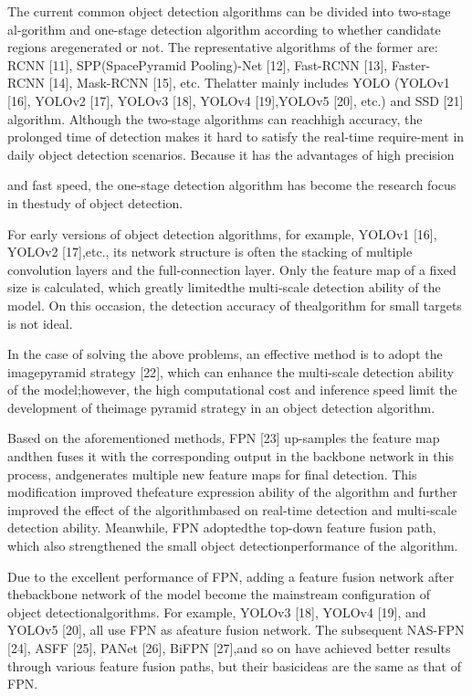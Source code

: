 \documentclass[
  10
]{article}
\begin{document}
The current common object detection algorithms can be divided into
two-stage al-gorithm and one-stage detection algorithm according to
whether candidate regions aregenerated or not. The representative
algorithms of the former are: RCNN {[}11{]}, SPP(SpacePyramid
Pooling)-Net {[}12{]}, Fast-RCNN {[}13{]}, Faster-RCNN {[}14{]},
Mask-RCNN {[}15{]}, etc. Thelatter mainly includes YOLO (YOLOv1
{[}16{]}, YOLOv2 {[}17{]}, YOLOv3 {[}18{]}, YOLOv4 {[}19{]},YOLOv5
{[}20{]}, etc.) and SSD {[}21{]} algorithm. Although the two-stage
algorithms can reachhigh accuracy, the prolonged time of detection makes
it hard to satisfy the real-time require-ment in daily object detection
scenarios. Because it has the advantages of high precision

and fast speed, the one-stage detection algorithm has become the
research focus in thestudy of object detection.

For early versions of object detection algorithms, for example, YOLOv1
{[}16{]}, YOLOv2 {[}17{]},etc., its network structure is often the
stacking of multiple convolution layers and the full-connection layer.
Only the feature map of a fixed size is calculated, which greatly
limitedthe multi-scale detection ability of the model. On this occasion,
the detection accuracy of thealgorithm for small targets is not ideal.

In the case of solving the above problems, an effective method is to
adopt the imagepyramid strategy {[}22{]}, which can enhance the
multi-scale detection ability of the model;however, the high
computational cost and inference speed limit the development of theimage
pyramid strategy in an object detection algorithm.

Based on the aforementioned methods, FPN {[}23{]} up-samples the feature
map andthen fuses it with the corresponding output in the backbone
network in this process, andgenerates multiple new feature maps for
final detection. This modification improved thefeature expression
ability of the algorithm and further improved the effect of the
algorithmbased on real-time detection and multi-scale detection ability.
Meanwhile, FPN adoptedthe top-down feature fusion path, which also
strengthened the small object detectionperformance of the algorithm.

Due to the excellent performance of FPN, adding a feature fusion network
after thebackbone network of the model become the mainstream
configuration of object detectionalgorithms. For example, YOLOv3
{[}18{]}, YOLOv4 {[}19{]}, and YOLOv5 {[}20{]}, all use FPN as afeature
fusion network. The subsequent NAS-FPN {[}24{]}, ASFF {[}25{]}, PANet
{[}26{]}, BiFPN {[}27{]},and so on have achieved better results through
various feature fusion paths, but their basicideas are the same as that
of FPN.
\end{document}
